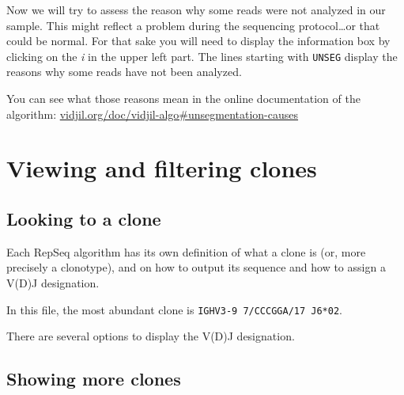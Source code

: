 \documentclass[10pt]{article}
\begin{document}
Now we will try to assess the reason why some reads were not analyzed in our
sample.
This might reflect a problem during the sequencing protocol\dots or that could
be normal.
For that sake you will need to display the information box by clicking on the
\textit{i} in the upper left part.
The lines starting with \texttt{UNSEG} display the reasons why some reads have
not been analyzed.

You can see what those reasons mean in the online documentation of the
algorithm: \href{http://www.vidjil.org/doc/vidjil-algo\#unsegmentation-causes}{vidjil.org/doc/vidjil-algo\#unsegmentation-causes
}

\section{Viewing and filtering clones}


\subsection{Looking to a clone}

Each RepSeq algorithm has its own definition of what a clone is (or, more precisely
a clonotype), and on how to output its sequence and how to assign a V(D)J designation.

In this file, the most abundant clone
is \texttt{IGHV3-9 7/CCCGGA/17 J6*02}.


There are several options to display the V(D)J designation.

  

\subsection{Showing more clones}
\end{document}
